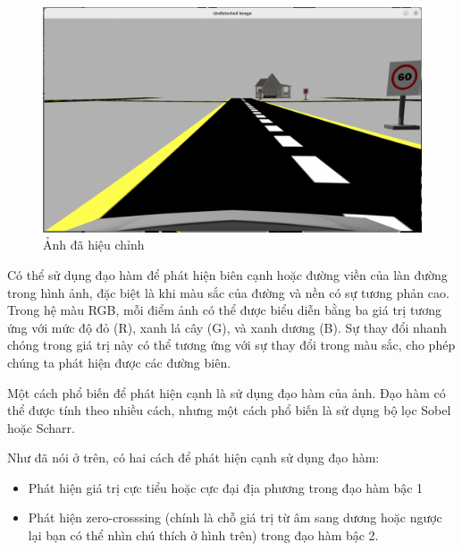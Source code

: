 \begin{figure}[htp]
    \centering
    \includegraphics[width=0.4\linewidth]{images/3-lane/u._img.png}
    \caption{Ảnh đã hiệu chỉnh}
\end{figure}
\noindent Có thể sử dụng đạo hàm để phát hiện biên cạnh hoặc đường viền của làn đường trong hình ảnh, đặc biệt là khi màu sắc của đường và nền có sự tương phản cao. Trong hệ màu RGB, mỗi điểm ảnh có thể được biểu diễn bằng ba giá trị tương ứng với mức độ đỏ (R), xanh lá cây (G), và xanh dương (B). Sự thay đổi nhanh chóng trong giá trị này có thể tương ứng với sự thay đổi trong màu sắc, cho phép chúng ta phát hiện được các đường biên.

\noindent Một cách phổ biến để phát hiện cạnh là sử dụng đạo hàm của ảnh. Đạo hàm có thể được tính theo nhiều cách, nhưng một cách phổ biến là sử dụng bộ lọc Sobel hoặc Scharr. 

\noindent Như đã nói ở trên, có hai cách để phát hiện cạnh sử dụng đạo hàm:
\begin{itemize}
    \item Phát hiện giá trị cực tiểu hoặc cực đại địa phương trong đạo hàm bậc 1
    \item Phát hiện zero-crosssing (chính là chỗ giá trị từ âm sang dương hoặc ngược lại bạn có thể nhìn chú thích ở hình trên) trong đạo hàm bậc 2.
\end{itemize}


